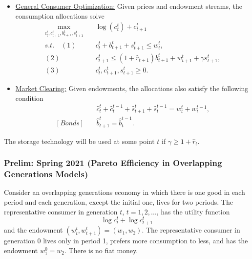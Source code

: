 \documentclass[11pt,english]{article}
\begin{document}
\begin{enumerate}
\begin{solution}
\begin{itemize}
\item \underline{General Consumer Optimization:} Given prices and endowment streams, the consumption allocations solve
\begin{align*}
\max_{c_t^t, c_{t+1}^t, b_{t+1}^t, s_{t+1}^t}&\quad \log(c_t^t) + c_{t+1}^t\\
s.t.\quad (1)&\quad c_t^t  + b_{t+1}^t + s_{t+1}^t\leq w_t^t,\\
(2)&\quad c_{t+1}^t  \leq (1+\hat{r}_{t+1})b_{t+1}^t+ w_{t+1}^t + \gamma s_{t+1}^t,\\
(3)&\quad c_t^t, c_{t+1}^t , s_{t+1}^t\geq 0.
\end{align*}

\item \underline{Market Clearing:} Given endowments, the allocations also satisfy the following condition
\begin{align*}
[Goods]&\quad \hat{c}_t^t + \hat{c}_t^{t-1} + \hat{s}_{t+1}^t + \hat{s}_{t}^{t-1} = w_t^t + w_t^{t-1},\\
[Bonds]&\quad \hat{b}_{t+1}^t = \hat{b}_{t}^{t-1}.
\end{align*}
\end{itemize}
The storage technology will be used at some point $t$ if $\gamma \geq 1 + \hat{r}_t$.
    \end{solution}
\end{enumerate}

\subsubsection{Prelim: Spring 2021 (Pareto Efficiency in Overlapping Generations Models)}
Consider an overlapping generations economy in which there is one good in each
period and each generation, except the initial one, lives for two periods. The
representative consumer in generation $t$, $t = 1, 2, \ldots$, has the
utility function
\[
    \log c_t^t + \log c_{t+1}^t
\]
and the endowment $(w_t^t, w_{t+1}^t) = (w_1, w_2)$. The representative
consumer in generation 0 lives only in period 1, prefers more consumption to
less, and has the endowment $w_1^0 = w_2$. There is no fiat money.
 
\end{document}
